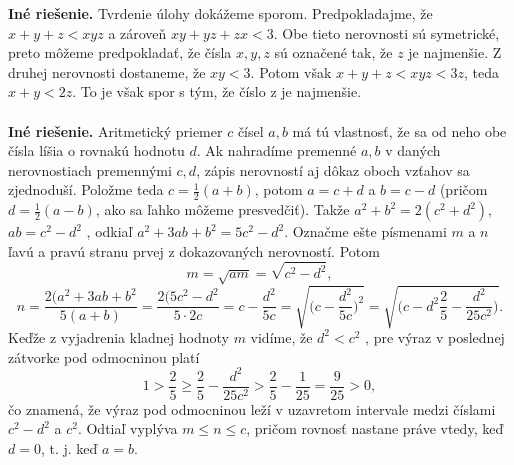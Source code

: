 \textbf{Iné riešenie.} Tvrdenie úlohy dokážeme sporom. Predpokladajme, že $x + y + z < xyz$ a zároveň $xy + yz + zx < 3$. Obe tieto nerovnosti sú symetrické, preto môžeme predpokladať, že čísla $x, y, z$ sú označené tak, že $z$ je najmenšie. Z druhej nerovnosti
dostaneme, že $xy < 3$. Potom však $x + y + z < xyz < 3z$, teda $x + y < 2z$. To je však spor s tým, že číslo z je najmenšie.\\
\\
\textbf{Iné riešenie.} Aritmetický priemer $c$ čísel $a, b$ má tú vlastnosť, že sa od neho obe čísla líšia o rovnakú hodnotu $d$. Ak nahradíme premenné $a, b$ v daných nerovnostiach premennými $c, d$, zápis nerovností aj dôkaz oboch vzťahov sa zjednoduší. Položme teda $c = \frac{1}{2}(a + b)$, potom $a = c + d$ a $b = c - d$ (pričom $d =\frac{1}{2}(a - b)$, ako sa ľahko môžeme presvedčiť). Takže $a^2 + b^2 = 2(c^2 + d^2)$, $ab = c^2 - d^2$ , odkiaľ $a^2 + 3ab + b^2 = 5c^2 - d^2$.
Označme ešte písmenami $m$ a $n$ ľavú a pravú stranu prvej z dokazovaných nerovností. Potom
$$m=\sqrt{am}=\sqrt{c^2-d^2},$$
$$ n=\frac{2(a^2+3ab+b^2}{5(a+b)}=\frac{2(5c^2-d^2}{5\cdot 2c}=c-\frac{d^2}{5c}=\sqrt{\bigg(c-\frac{d^2}{5c} \bigg)^2}=\sqrt{\bigg(c-d^2\frac{2}{5}-\frac{d^2}{25c^2} \bigg)}.$$ Keďže z vyjadrenia kladnej hodnoty $m$ vidíme, že $d^2 < c^2$ , pre výraz v poslednej zátvorke pod odmocninou platí
$$1>\frac{2}{5}\geq\frac{2}{5}-\frac{d^2}{25c^2}>\frac{2}{5}-\frac{1}{25}=\frac{9}{25}>0,$$ čo znamená, že výraz pod odmocninou leží v uzavretom intervale medzi číslami $c^2 - d^2$ a $c^2$. Odtiaľ vyplýva $m \leq n \leq c$, pričom rovnosť nastane práve vtedy, keď $d = 0$, t. j. keď $a = b$.

